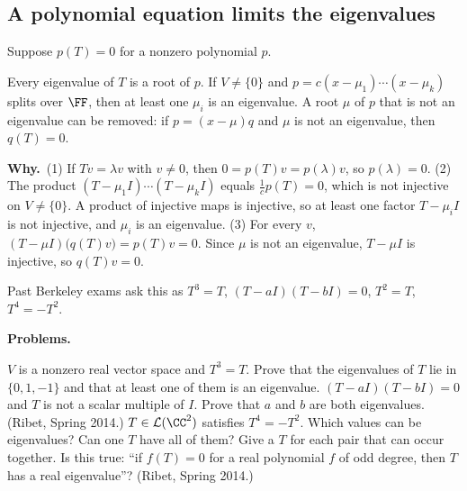 \documentclass[10pt]{scrartcl}
\newcommand{\LL}{\mathcal L}
\begin{document}
\newcommand{\why}{\par\noindent\textbf{Why.}\ }
\newcommand{\probs}{\par\medskip\noindent\textbf{Problems.}}

\subsection{A polynomial equation limits the eigenvalues}
\begin{theorem*}[T1]
  Suppose $p(T)=0$ for a nonzero polynomial $p$.
  \begin{enumerate}
    \ii Every eigenvalue of $T$ is a root of $p$.
    \ii If $V\ne\{0\}$ and $p=c(x-\mu_1)\cdots(x-\mu_k)$ splits over $\FF$, then at least one $\mu_i$ is an eigenvalue.
    \ii A root $\mu$ of $p$ that is not an eigenvalue can be removed: if $p=(x-\mu)q$ and $\mu$ is not an eigenvalue, then $q(T)=0$.
  \end{enumerate}
\end{theorem*}
\why (1) If $Tv=\lambda v$ with $v\ne0$, then $0=p(T)v=p(\lambda)v$, so $p(\lambda)=0$.
(2) The product $(T-\mu_1I)\cdots(T-\mu_kI)$ equals $\frac1cp(T)=0$, which is not injective on $V\ne\{0\}$. A product of injective maps is injective, so at least one factor $T-\mu_iI$ is not injective, and $\mu_i$ is an eigenvalue.
(3) For every $v$, $(T-\mu I)\big(q(T)v\big)=p(T)v=0$. Since $\mu$ is not an eigenvalue, $T-\mu I$ is injective, so $q(T)v=0$.

Past Berkeley exams ask this as $T^3=T$, $(T-aI)(T-bI)=0$, $T^2=T$, $T^4=-T^2$.
\probs
\begin{enumerate}[(a)]
  \ii $V$ is a nonzero real vector space and $T^3=T$. Prove that the eigenvalues of $T$ lie in $\{0,1,-1\}$ and that at least one of them is an eigenvalue.
  \ii $(T-aI)(T-bI)=0$ and $T$ is not a scalar multiple of $I$. Prove that $a$ and $b$ are both eigenvalues. (Ribet, Spring 2014.)
  \ii $T\in\LL(\CC^2)$ satisfies $T^4=-T^2$. Which values can be eigenvalues? Can one $T$ have all of them? Give a $T$ for each pair that can occur together.
  \ii Is this true: ``if $f(T)=0$ for a real polynomial $f$ of odd degree, then $T$ has a real eigenvalue''? (Ribet, Spring 2014.)
\end{enumerate}
\end{document}
